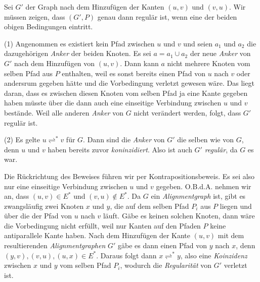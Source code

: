 \begin{beweis}
	Sei $G'$ der Graph nach dem Hinzufügen der Kanten $(u,v)$ und $(v,u)$. Wir müssen zeigen, dass $(G',P)$ genau dann regulär ist, wenn eine der beiden obigen Bedingungen eintritt.
	
	\bewhin (1) Angenommen es existiert kein Pfad zwischen $u$ und $v$ und seien $a_1$ und $a_2$ die dazugehörigen \emph{Anker} der beiden Knoten. Es sei $a = a_1 \cup a_2$ der neue \emph{Anker} von $G'$ nach dem Hinzufügen von $(u,v)$. Dann kann $a$ nicht mehrere Knoten vom selben Pfad aus $P$ enthalten, weil es sonst bereits einen Pfad von $u$ nach $v$ oder andersrum gegeben hätte und die Vorbedingung verletzt gewesen wäre. Das liegt daran, dass es zwischen diesen Knoten vom selben Pfad ja eine Kante gegeben haben müsste über die dann auch eine einseitige Verbindung zwischen $u$ und $v$ bestände. Weil alle anderen \emph{Anker} von $G$ nicht verändert werden, folgt, dass $G'$ regulär ist.
	
	(2) Es gelte $u \rightleftharpoons^{*} v$ für $G$. Dann sind die \emph{Anker} von $G'$ die selben wie von $G$, denn $u$ und $v$ haben bereits zuvor \emph{koninzidiert}. Also ist auch $G'$ \emph{regulär}, da $G$ es war.
	
	\bewrueck Die Rückrichtung des Beweises führen wir per Kontrapositionsbeweis. Es sei also nur eine einseitige Verbindung zwischen $u$ und $v$ gegeben. O.B.d.A. nehmen wir an, dass $(u,v) \in E^{*}$ und $(v,u) \notin E^{*}$. Da $G$ ein \emph{Alignmentgraph} ist, gibt es zwangsläufig zwei Knoten $x$ und $y$, die auf dem selben Pfad $P_i$ aus $P$ liegen und über die der Pfad von $u$ nach $v$ läuft. Gäbe es keinen solchen Knoten, dann wäre die Vorbedingung nicht erfüllt, weil nur Kanten auf den Pfaden $P$ keine antiparallele Kante haben. Nach dem Hinzufügen der Kante $(u,v)$ mit dem resultierenden \emph{Alignmentgraphen} $G'$ gäbe es dann einen Pfad von $y$ nach $x$, denn $(y,v), (v,u), (u,x) \in E^{*}$. Daraus folgt dann $x \rightleftharpoons^{*} y$, also eine \emph{Koinzidenz} zwischen $x$ und $y$ vom selben Pfad $P_i$, wodurch die \emph{Regularität} von $G'$ verletzt ist.
\end{beweis}


